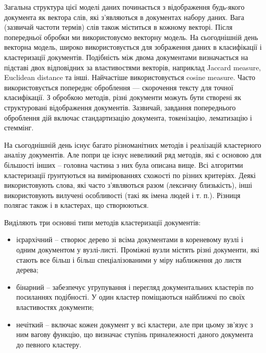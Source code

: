 Загальна структура цієї моделі даних починається з відображення будь-якого документа як вектора слів, які з'являються в документах набору даних. Вага (зазвичай частоти термів) слів також міститься в кожному векторі. Після попередньої обробки ми використовуємо векторну модель. На сьогоднішній день векторна модель, широко використовується для зображення даних в класифікації і кластеризації документів. Подібність між двома документами визначається на підставі двох відповідних за властивостями векторів, наприклад Jaccard measure, Euclidean distance та інші. Найчастіше використовується cosine measure. Часто використовується попереднє оброблення — скорочення тексту для точної класифікації. З обробкою методів, різні документи можуть бути створені як структуровані відображення документів. Зазвичай, завдання попереднього оброблення дій включає стандартизацію документа, токенізацію, лематизацію і стеммінг.

На сьогоднішній день існує багато різноманітних методів і реалізацій кластерного аналізу документів. Але попри це існує невеликий ряд методів, які є основою для більшості інших – головна частина з них була описана вище. Всі алгоритми кластеризації ґрунтуються на вимірюваннях схожості по різних критеріях. Деякі використовують слова, які часто з'являються разом (лексичну близькість), інші використовують вилучені особливості (такі як імена людей і т. п.). Різниця полягає також і в кластерах, що створюються.

Виділяють три основні типи методів кластеризації документів:
\begin{itemize}
	\item ієрархічний – створює дерево зі всіма документами в кореневому вузлі і одним документом у вузлі-листі. Проміжні вузли містять різні документи, які стають все більш і більш спеціалізованими у міру наближення до листя дерева;
	\item бінарний – забезпечує угрупування і перегляд документальних кластерів по посиланнях подібності. У один кластер поміщаються найближчі по своїх властивостях документи;
	\item нечіткий – включає кожен документ у всі кластери, але при цьому зв'язує з ним вагову функцію, що визначає ступінь приналежності даного документа до певного кластеру.
\end{itemize}

